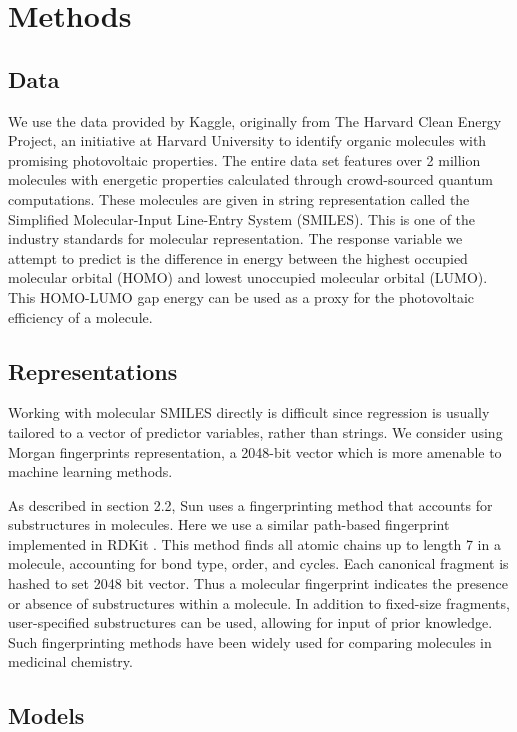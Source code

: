 \chapter{Methods}

\section{Data}

We use the data provided by Kaggle, originally from The Harvard Clean Energy Project, an initiative at Harvard University to identify organic molecules with promising photovoltaic properties. The entire data set features over 2 million molecules with energetic properties calculated through crowd-sourced quantum computations. These molecules are given in string representation called the Simplified Molecular-Input Line-Entry System (SMILES). This is one of the industry standards for molecular representation. The response variable we attempt to predict is the difference in energy between the highest occupied molecular orbital (HOMO) and lowest unoccupied molecular orbital (LUMO). This HOMO-LUMO gap energy can be used as a proxy for the photovoltaic efficiency of a molecule.

\section{Representations}

Working with molecular SMILES directly is difficult since regression is usually tailored to a vector of predictor variables, rather than strings. We consider using Morgan fingerprints representation, a 2048-bit vector which is more amenable to machine learning methods.

As described in section 2.2, Sun \cite{sun2014learning} uses a fingerprinting method that accounts for substructures in molecules. Here we use a similar path-based fingerprint implemented in RDKit \cite{landrum2006rdkit}. This method finds all atomic chains up to length 7 in a molecule, accounting for bond type, order, and cycles. Each canonical fragment is hashed to set 2048 bit vector. Thus a molecular fingerprint indicates the presence or absence of substructures within a molecule. In addition to fixed-size fragments, user-specified substructures can be used, allowing for input of prior knowledge. Such fingerprinting methods have been widely used for comparing molecules in medicinal chemistry.

\section{Models}

